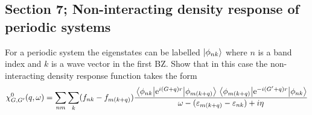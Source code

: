 \subsection{Section 7; Non-interacting density response of periodic systems}
\begin{exercise}
For a periodic system the eigenstates can be labelled $|\phi_{nk}\rangle$ where $n$ is a band index and $k$ is a wave vector in the first BZ. Show that in this case the non-interacting density response function takes the form
{\small \begin{equation}
    \chi_{G,G'}^{0}(q,\omega) = \sum_{nm}\sum_{k}(f_{nk}-f_{m(k+q)})\dfrac{\mel{\phi_{nk}}{\mathrm{e}^{i(G+q)r}}{\phi_{m(k+q)}}\mel{\phi_{m(k+q)}}{\mathrm{e}^{-i(G'+q)r}}{\phi_{nk}}}{\omega - (\varepsilon_{m(k+q)}-\varepsilon_{nk}) + i\eta}
\end{equation}}
\end{exercise}

